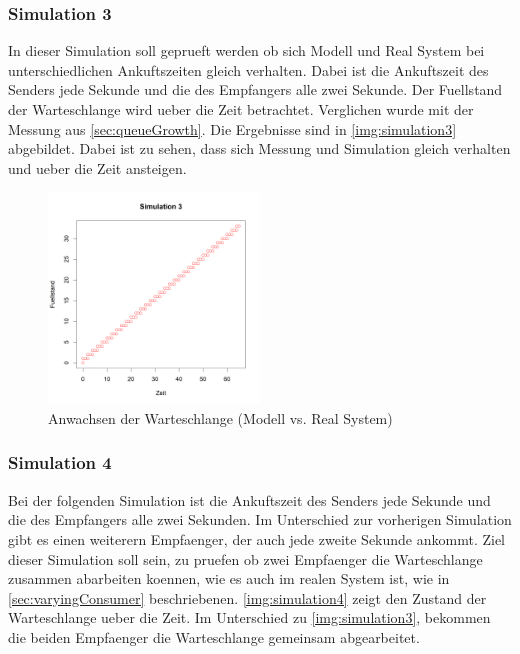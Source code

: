 \subsubsection{Simulation 3}
In dieser Simulation soll geprueft werden ob sich Modell und Real System bei unterschiedlichen Ankuftszeiten gleich verhalten. Dabei ist die Ankuftszeit des Senders jede Sekunde und die des Empfangers alle zwei Sekunde. Der Fuellstand der Warteschlange wird ueber die Zeit betrachtet. Verglichen wurde mit der Messung aus \autoref{sec:queueGrowth}.
Die Ergebnisse sind in \autoref{img:simulation3} abgebildet. Dabei ist zu sehen, dass sich Messung und Simulation gleich verhalten und ueber die Zeit ansteigen.
\begin{figure}
\center
  \includegraphics[width=0.5\textwidth]{images/modelSimulationResults/simulation3.png}
  \caption{Anwachsen der Warteschlange (Modell vs. Real System)}
  \label{img:simulation3}
\end{figure}

\subsubsection{Simulation 4}
Bei der folgenden Simulation ist die Ankuftszeit des Senders jede Sekunde und die des Empfangers alle zwei Sekunden. Im Unterschied zur vorherigen Simulation gibt es einen weiterern Empfaenger, der auch jede zweite Sekunde ankommt. Ziel dieser Simulation soll sein, zu pruefen ob zwei Empfaenger die Warteschlange zusammen abarbeiten koennen, wie es auch im realen System ist, wie in \autoref{sec:varyingConsumer} beschriebenen.
\autoref{img:simulation4} zeigt den Zustand der Warteschlange ueber die Zeit. Im Unterschied zu \autoref{img:simulation3}, bekommen die beiden Empfaenger die Warteschlange gemeinsam abgearbeitet.

